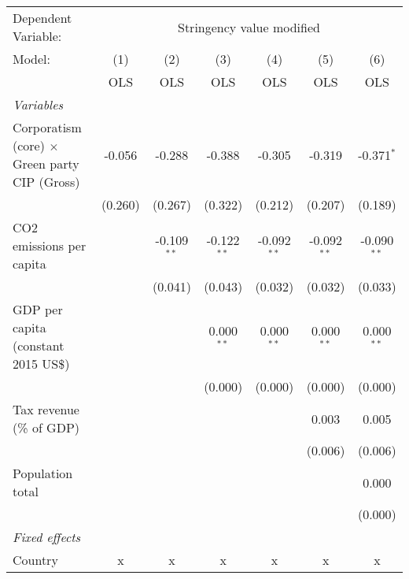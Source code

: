 
\begingroup
\centering
\begin{tabular}{lcccccc}
   \toprule
   Dependent Variable: & \multicolumn{6}{c}{Stringency value modified}\\
   Model:                                               & (1)     & (2)           & (3)           & (4)           & (5)           & (6)\\  
                                                        &  OLS    & OLS           & OLS           & OLS           & OLS           & OLS\\  
   \midrule
   \emph{Variables}\\
   Corporatism (core) $\times$ Green party CIP (Gross)  & -0.056  & -0.288        & -0.388        & -0.305        & -0.319        & -0.371$^{*}$\\   
                                                        & (0.260) & (0.267)       & (0.322)       & (0.212)       & (0.207)       & (0.189)\\   
   CO2 emissions per capita                             &         & -0.109$^{**}$ & -0.122$^{**}$ & -0.092$^{**}$ & -0.092$^{**}$ & -0.090$^{**}$\\   
                                                        &         & (0.041)       & (0.043)       & (0.032)       & (0.032)       & (0.033)\\   
   GDP per capita (constant 2015 US\$)                  &         &               & 0.000$^{**}$  & 0.000$^{**}$  & 0.000$^{**}$  & 0.000$^{**}$\\   
                                                        &         &               & (0.000)       & (0.000)       & (0.000)       & (0.000)\\   
   Tax revenue (\% of GDP)                              &         &               &               &               & 0.003         & 0.005\\   
                                                        &         &               &               &               & (0.006)       & (0.006)\\   
   Population total                                     &         &               &               &               &               & 0.000\\   
                                                        &         &               &               &               &               & (0.000)\\   
   \emph{Fixed effects}\\
   Country                                              & x       & x             & x             & x             & x             & x\\  

\end{tabular}
